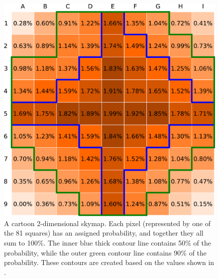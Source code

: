 \begin{colsection}
\begin{colsection}
\begin{figure}[p]
    \begin{center}
        \includegraphics[width=0.95\linewidth]{images/sim/sim_skymap_probs.pdf}
    \end{center}
    \caption[An example 2D probability skymap]{
        A cartoon 2-dimensional skymap. Each pixel (represented by one of the 81 squares) has an assigned probability, and together they all sum to 100\%. The inner blue thick contour line contains 50\% of the probability, while the outer green contour line contains 90\% of the probability. These contours are created based on the values shown in .
    }\label{fig:sim_skymap_probs}
\end{figure}


\end{colsection}
\end{colsection}
